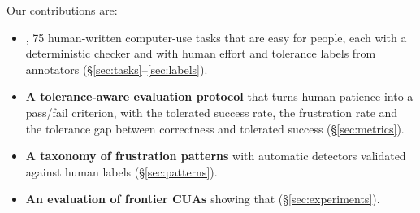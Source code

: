 Our contributions are:
\begin{itemize}\setlength\itemsep{0pt}
\item \textbf{\bench}, 75 human-written computer-use tasks that are easy for people, each with a deterministic checker and with human effort and tolerance labels from  annotators (\S\ref{sec:tasks}--\ref{sec:labels}).
\item \textbf{A tolerance-aware evaluation protocol} that turns human patience into a pass/fail criterion, with the tolerated success rate, the frustration rate and the tolerance gap between correctness and tolerated success (\S\ref{sec:metrics}).
\item \textbf{A taxonomy of frustration patterns} with automatic detectors validated against human labels (\S\ref{sec:patterns}).
\item \textbf{An evaluation of  frontier CUAs} showing that  (\S\ref{sec:experiments}).
\end{itemize}
